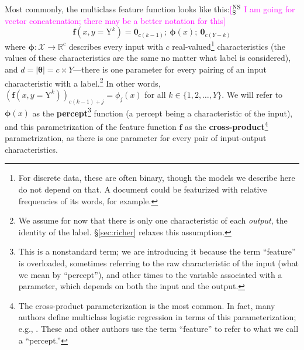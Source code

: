 \documentclass[11pt,letterpaper]{article}
\newcommand{\ensuretext}[1]{#1}
\newcommand{\nssmarker}{\ensuretext{\textcolor{magenta}{\ensuremath{^{\textsc{NS}}_{\textsc{S}}}}}}
\newcommand{\arkcomment}[3]{\ensuretext{\textcolor{#3}{[#1 #2]}}}
\newcommand{\nss}[1]{\arkcomment{\nssmarker}{#1}{magenta}}
\newcommand{\Sref}[1]{\S\ref{#1}}
\begin{document}
Most commonly, the multiclass feature function looks like this:\nss{I am going for vector concatenation; there may be a better notation for this}
\begin{equation}\label{eq:crossprod}
\mathbf{f}(x,y=\mathrm{Y}^k) = \mathbf{0}_{c(k-1)};\  \boldsymbol{\phi}(x);\  \mathbf{0}_{c(Y-k)}
\end{equation}
where $\boldsymbol{\phi}: \mathcal{X}\rightarrow\mathbb{R}^c$ describes every input with $c$ real-valued\footnote{For discrete data, these are often binary, though the models we describe here do not depend on that. A document could be featurized with relative frequencies of its words, for example.} 
characteristics (the values of these characteristics are the same no matter what label is considered), 
and $d = |\boldsymbol{\theta}| = c \times Y$---there is one parameter for every pairing of an input characteristic with a label.\footnote{We assume 
for now that there is only one characteristic of each {\em output}, the identity of the label. \Sref{sec:richer} relaxes this assumption.}
In other words, $\left(\mathbf{f}(x,y=\mathrm{Y}^k)\right)_{c(k-1)+j} = \phi_j(x)$ for all $k\in\{1,2,\ldots,Y\}$.
We will refer to $\boldsymbol{\phi}(x)$ as the {\bf percept}\footnote{This is a nonstandard term; we are introducing 
it because the term ``feature'' is overloaded, sometimes referring to the raw characteristic of the input (what we mean by ``percept''),
and other times to the variable associated with a parameter, 
which depends on both the input and the output.} function (a percept being a characteristic of the input),
and this parametrization of the feature function $\mathbf{f}$ as the {\bf cross-product}\footnote{The cross-product parameterization is the most common. 
In fact, many authors define multiclass logistic regression in terms of this parameterization; e.g., \citet{hastie-09}. 
These and other authors use the term ``feature'' to refer to what we call a ``percept.''}
parametrization, as there is one parameter for every pair of input-output characteristics.
\end{document}
